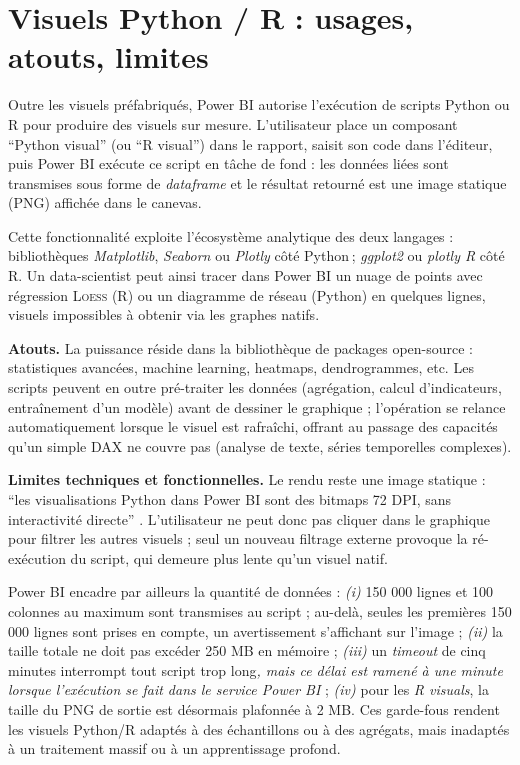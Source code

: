 \section{Visuels Python / R : usages, atouts, limites}
\label{sec:python-r-visuals}

Outre les visuels préfabriqués, Power BI autorise l’exécution de scripts
Python ou R pour produire des visuels sur mesure.  
L’utilisateur place un composant \enquote{Python visual} (ou \enquote{R visual})
dans le rapport, saisit son code dans l’éditeur, puis Power BI exécute ce
script en tâche de fond : les données liées sont transmises sous forme de
\textit{dataframe} et le résultat retourné est une image statique (PNG)
affichée dans le canevas.

Cette fonctionnalité exploite l’écosystème analytique des deux langages :
bibliothèques \textit{Matplotlib}, \textit{Seaborn} ou \textit{Plotly} côté
Python ; \textit{ggplot2} ou \textit{plotly R} côté R.  
Un data-scientist peut ainsi tracer dans Power BI un nuage de points avec
régression \textsc{Loess} (R) ou un diagramme de réseau (Python) en quelques
lignes, visuels impossibles à obtenir via les graphes natifs.


\textbf{Atouts.}  
La puissance réside dans la bibliothèque de packages open-source :
statistiques avancées, machine learning, heatmaps, dendrogrammes, etc.
Les scripts peuvent en outre pré-traiter les données (agrégation, calcul
d’indicateurs, entraînement d’un modèle) avant de dessiner le graphique ;
l’opération se relance automatiquement lorsque le visuel est rafraîchi,
offrant au passage des capacités qu’un simple DAX ne couvre pas (analyse de
texte, séries temporelles complexes).


\textbf{Limites techniques et fonctionnelles.}  
Le rendu reste une image statique : \enquote{les visualisations Python dans
Power BI sont des bitmaps 72 DPI, sans interactivité directe}
\parencite{MicrosoftPythonRVisualsDocs2024}.  
L’utilisateur ne peut donc pas cliquer dans le graphique pour filtrer les
autres visuels ; seul un nouveau filtrage externe provoque la ré-exécution
du script, qui demeure plus lente qu’un visuel natif.

Power BI encadre par ailleurs la quantité de données :  
\emph{(i)} 150 000 lignes et 100 colonnes au maximum sont transmises au
script ; au-delà, seules les premières 150 000 lignes sont prises en compte,
un avertissement s’affichant sur l’image ;  
\emph{(ii)} la taille totale ne doit pas excéder 250 MB en mémoire ;  
\emph{(iii)} un \textit{timeout} de cinq minutes interrompt tout script trop
long\parencite{MicrosoftPythonRVisualsDocs2024}\emph{, mais ce délai est ramené à
une minute lorsque l’exécution se fait dans le service Power BI}
\parencite{MicrosoftRPackagesService2025} ;
\emph{(iv)} pour les \textit{R visuals}, la taille du PNG de sortie est
désormais plafonnée à 2 MB\parencite{MicrosoftRVisualsDocs2025}.   
Ces garde-fous rendent les visuels Python/R adaptés à des échantillons ou à
des agrégats, mais inadaptés à un traitement massif ou à un apprentissage
profond.

